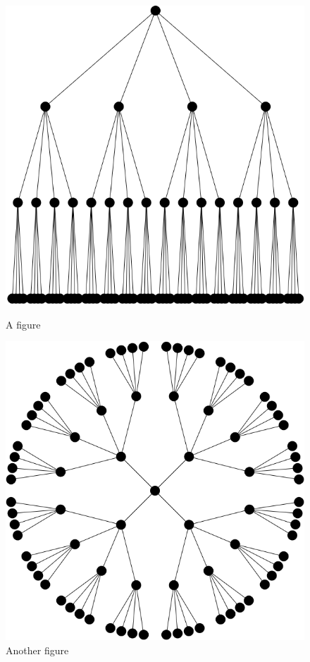 \begin{figure}
	\centering
	\begin{minipage}{.5\textwidth}
		\centering
		\includegraphics[width=.9\linewidth]{../screenshots/lineargraphexample.PNG}
		\caption{A figure}
		\label{fig:test1}
	\end{minipage}%
	\begin{minipage}{.5\textwidth}
		\centering
		\includegraphics[width=.9\linewidth]{../screenshots/radialgraphexample.PNG}
		\caption{Another figure}
		\label{fig:test2}
	\end{minipage}
\end{figure}
